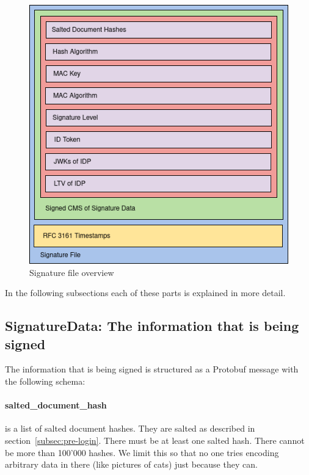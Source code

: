 \begin{figure}[H]
	\begin{center}
		\includegraphics[scale=0.5]{images/signature_file.png}
		\caption{Signature file overview}
		\label{fig:signaturefile}
	\end{center}
\end{figure}

In the following subsections each of these parts is explained in more detail.

\subsection{SignatureData: The information that is being signed}\label{subsec:signaturedata:-the-information-that-is-being-signed}
The information that is being signed is structured as a Protobuf message with the following schema:



\paragraph{salted\_document\_hash} is a list of salted document hashes.
They are salted as described in section~\ref{subsec:pre-login}.
There must be at least one salted hash.
There cannot be more than 100'000 hashes.
We limit this so that no one tries encoding arbitrary data in there (like pictures of cats) just because they can.

